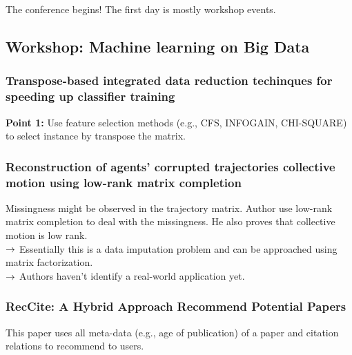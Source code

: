 The conference begins! The first day is mostly workshop events.

\subsection{Workshop: Machine learning on Big Data}

\subsubsection{Transpose-based integrated data reduction techinques for speeding up classifier training}

{\bf Point 1:} Use feature selection methods (e.g., CFS, INFOGAIN, CHI-SQUARE) to select instance by transpose the matrix.\\


\subsubsection{Reconstruction of agents' corrupted trajectories collective motion using low-rank matrix completion}


Missingness might be observed in the trajectory matrix. Author use low-rank matrix completion to deal with the missingness. He also proves that collective motion is low rank.\\

$\rightarrow$ Essentially this is a data imputation problem and can be approached using matrix factorization. \\

$\rightarrow$ Authors haven't identify a real-world application yet. \\

\subsubsection{RecCite: A Hybrid Approach Recommend Potential Papers}

This paper uses all meta-data (e.g., age of publication) of a paper and citation relations to recommend to users.\\

